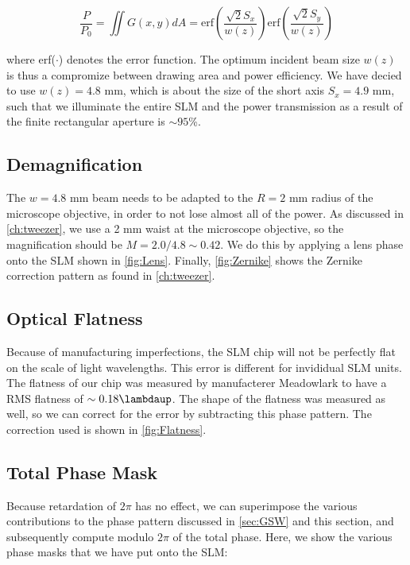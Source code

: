 \begin{equation}\label{eq:RectAperturePower}
    \frac{P}{P_0} =
    \iint G(x,y) dA=
    \text{erf}\left(\frac{\sqrt{2}S_x}{w(z)}\right) \text{erf}\left(\frac{\sqrt{2}S_y}{w(z)}\right)
\end{equation}

where erf($\cdot$) denotes the error function. 
The optimum incident beam size $w(z)$ is thus a compromize between drawing area and power efficiency. 
We have decied to use $w(z) = 4.8$ mm, which is about the size of the short axis $S_x = 4.9$ mm, such that we illuminate the entire \ac{SLM} and the power transmission as a result of the finite rectangular aperture is $\sim 95$\%.

\subsection{Demagnification}

The $w = 4.8$ mm beam needs to be adapted to the $R = 2$ mm radius of the microscope objective, in order to not lose almost all of the power. 
As discussed in \cref{ch:tweezer}, we use a 2 mm waist at the microscope objective, so the magnification should be $M = 2.0 / 4.8 \sim 0.42$. 
We do this by applying a lens phase onto the SLM shown in \cref{fig:Lens}. 
Finally, \cref{fig:Zernike} shows the Zernike correction pattern as found in \cref{ch:tweezer}.

\subsection{Optical Flatness}\label{subsec:Flatness}

Because of manufacturing imperfections, the SLM chip will not be perfectly flat on the scale of light wavelengths. 
This error is different for invididual SLM units.
The flatness of our chip was measured by manufacterer Meadowlark to have a RMS flatness of $\sim 0.18\lambdaup$.
The shape of the flatness was measured as well, so we can correct for the error by subtracting this phase pattern. 
The correction used is shown in \cref{fig:Flatness}.

\subsection{Total Phase Mask}

Because retardation of $2\pi$ has no effect, we can superimpose the various contributions to the phase pattern discussed in \cref{sec:GSW} and this section, and subsequently compute modulo $2\pi$ of the total phase. 
Here, we show the various phase masks that we have put onto the SLM:


